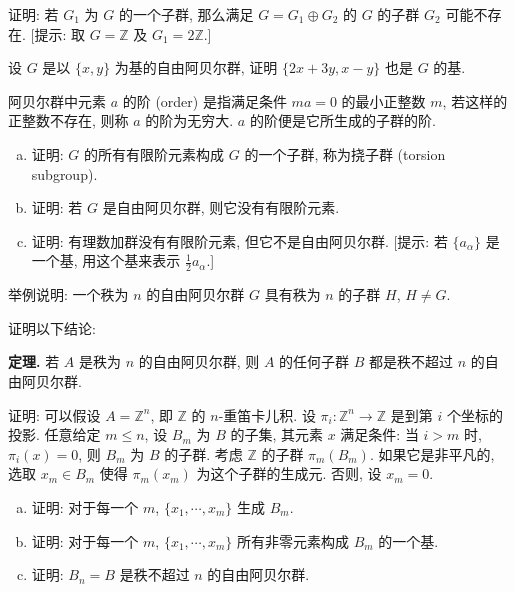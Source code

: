 \begin{exercise}\label{ch11:ex-direct-sum-2}
证明: 若 $G_{1}$ 为 $G$ 的一个子群, 那么满足 $G=G_{1}\oplus G_{2}$ 的 $G$ 的子群 $G_{2}$ 可能不存在. [提示: 取 $G=\mathbb{Z}$ 及 $G_{1}=2\mathbb{Z}$.]
\end{exercise}

\begin{exercise}\label{ch11:ex-direct-sum-3}
设 $G$ 是以 $\{x,y\}$ 为基的自由阿贝尔群, 证明 $\{2x+3y,x-y\}$ 也是 $G$ 的基.
\end{exercise}

\begin{exercise}\label{ch11:ex-direct-sum-4}
阿贝尔群中元素 $a$ 的阶 (order) 是指满足条件 $ma=0$ 的最小正整数 $m$, 若这样的正整数不存在, 则称 $a$ 的阶为无穷大. $a$ 的阶便是它所生成的子群的阶.

\begin{enumerate}[(a)]
\item 证明: $G$ 的所有有限阶元素构成 $G$ 的一个子群, 称为挠子群 (torsion subgroup).
\item 证明: 若 $G$ 是自由阿贝尔群, 则它没有有限阶元素.
\item 证明: 有理数加群没有有限阶元素, 但它不是自由阿贝尔群. [提示: 若 $\{a_{\alpha}\}$ 是一个基, 用这个基来表示 $\frac{1}{2}a_{\alpha}$.]
\end{enumerate}
\end{exercise}

\begin{exercise}\label{ch11:ex-direct-sum-5}
举例说明: 一个秩为 $n$ 的自由阿贝尔群 $G$ 具有秩为 $n$ 的子群 $H$, $H\neq G$.
\end{exercise}

\begin{exercise}\label{ch11:ex-direct-sum-6}
证明以下结论:

\textbf{定理.} 若 $A$ 是秩为 $n$ 的自由阿贝尔群, 则 $A$ 的任何子群 $B$ 都是秩不超过 $n$ 的自由阿贝尔群.

证明: 可以假设 $A=\mathbb{Z}^{n}$, 即 $\mathbb{Z}$ 的 $n$-重笛卡儿积. 设 $\pi_{i}\colon\mathbb{Z}^{n}\to\mathbb{Z}$ 是到第 $i$ 个坐标的投影. 任意给定 $m\leqslant n$, 设 $B_{m}$ 为 $B$ 的子集, 其元素 $x$ 满足条件: 当 $i>m$ 时, $\pi_{i}(x)=0$, 则 $B_{m}$ 为 $B$ 的子群. 考虑 $\mathbb{Z}$ 的子群 $\pi_{m}(B_{m})$. 如果它是非平凡的, 选取 $x_{m}\in B_{m}$ 使得 $\pi_{m}(x_{m})$ 为这个子群的生成元. 否则, 设 $x_{m}=0$.

\begin{enumerate}[(a)]
\item 证明: 对于每一个 $m$, $\{x_{1},\cdots,x_{m}\}$ 生成 $B_{m}$.
\item 证明: 对于每一个 $m$, $\{x_{1},\cdots,x_{m}\}$ 所有非零元素构成 $B_{m}$ 的一个基.
\item 证明: $B_{n}=B$ 是秩不超过 $n$ 的自由阿贝尔群.
\end{enumerate}
\end{exercise}